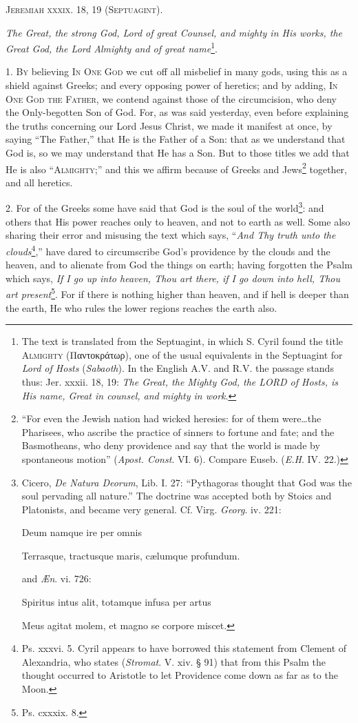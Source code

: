 
\textsc{Jeremiah xxxix. 18, 19} \textsc{(Septuagint).}

\emph{The Great, the strong God, Lord of great Counsel, and mighty in His works, the Great God, the Lord Almighty and of great name}\footnote{The text is translated from the Septuagint, in which S. Cyril found the title \textsc{Almighty} (\textgreek{Παντοκράτωρ}), one of the usual equivalents in the Septuagint for \emph{Lord of Hosts} (\emph{Sabaoth}). In the English A.V. and R.V. the passage stands thus: Jer. xxxii. 18, 19: \emph{The Great, the Mighty God, the LORD of Hosts, is His name, Great in counsel, and mighty in work}.}.

1. \textsc{By} believing \textsc{In One God} we cut off all misbelief in many gods, using this as a shield against Greeks; and every opposing power of heretics; and by adding, \textsc{In One God the Father}, we contend against those of the circumcision, who deny the Only-begotten Son of God. For, as was said yesterday, even before explaining the truths concerning our Lord Jesus Christ, we made it manifest at once, by saying “The Father,” that He is the Father of a Son: that as we understand that God is, so we may understand that He has a Son. But to those titles we add that He is also “\textsc{Almighty};” and this we affirm because of Greeks and Jews\footnote{“For even the Jewish nation had wicked heresies: for of them were…the Pharisees, who ascribe the practice of sinners to fortune and fate; and the Basmotheans, who deny providence and say that the world is made by spontaneous motion” (\emph{Apost. Const}. VI. 6). Compare Euseb. (\emph{E.H}. IV. 22.)} together, and all heretics.

2. For of the Greeks some have said that God is the soul of the world\footnote{Cicero, \emph{De Natura Deorum}, Lib. I. 27: “Pythagoras thought that God was the soul pervading all nature.” The doctrine was accepted both by Stoics and Platonists, and became very general. Cf. Virg. \emph{Georg}. iv. 221: \par Deum namque ire per omnis \par Terrasque, tractusque maris, cælumque profundum. \par and \emph{Æn}. vi. 726: \par Spiritus intus alit, totamque infusa per artus \par Meus agitat molem, et magno se corpore miscet.}: and others that His power reaches only to heaven, and not to earth as well. Some also sharing their error and misusing the text which says, “\emph{And Thy truth unto the clouds}\footnote{Ps. xxxvi. 5. Cyril appears to have borrowed this statement from Clement of Alexandria, who states (\emph{Stromat}. V. xiv. § 91) that from this Psalm the thought occurred to Aristotle to let Providence come down as far as to the Moon.},” have dared to circumscribe God’s providence by the clouds and the heaven, and to alienate from God the things on earth; having forgotten the Psalm which says, \emph{If I go up into heaven, Thou art there, if I go down into hell, Thou art present}\footnote{Ps. cxxxix. 8.}. For if there is nothing higher than heaven, and if hell is deeper than the earth, He who rules the lower regions reaches the earth also.

